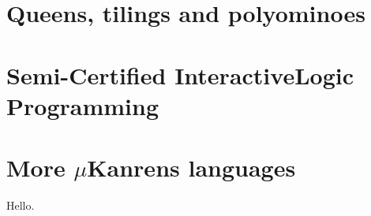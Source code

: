 \documentclass[nopart]{tufte-book}
\begin{document}


\chapter{Queens, tilings and polyominoes}
\label{ch:queens-tilings-polyominoes}



\chapter{Semi-Certified Interactive\newline Logic Programming} 
\label{ch:scilp}



\chapter{More $\mu$Kanrens languages}
\label{ch:more-kanrens}

Hello.



\backmatter




%

\printindex
\end{document}
